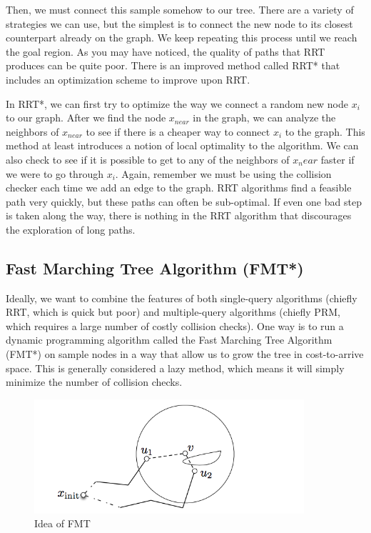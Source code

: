 \documentclass[twoside]{article}
\begin{document}
Then, we must connect this sample somehow to our tree. There are a variety of strategies we can use, but the simplest is to connect the new node to its closest counterpart already on the graph. We keep repeating this process until we reach the goal region. As you may have noticed, the quality of paths that RRT produces can be quite poor. There is an improved method called RRT* that includes an optimization scheme to improve upon RRT.

In RRT*, we can first try to optimize the way we connect a random new node $x_i$ to our graph. After we find the node $x_{near}$ in the graph, we can analyze the neighbors of $x_{near}$ to see if there is a cheaper way to connect $x_i$ to the graph. This method at least introduces a notion of local optimality to the algorithm. We can also check to see if it is possible to get to any of the neighbors of $x_near$ faster if we were to go through $x_i$. Again, remember we must be using the collision checker each time we add an edge to the graph. RRT algorithms find a feasible path very quickly, but these paths can often be sub-optimal. If even one bad step is taken along the way, there is nothing in the RRT algorithm that discourages the exploration of long paths.

\subsection{Fast Marching Tree Algorithm (FMT*)}
Ideally, we want to combine the features of both single-query algorithms (chiefly RRT, which is quick but poor) and multiple-query algorithms (chiefly PRM, which requires a large number of costly collision checks). One way is to run a dynamic programming algorithm called the Fast Marching Tree Algorithm (FMT*) on sample nodes in a way that allow us to grow the tree in cost-to-arrive space. This is generally considered a lazy method, which means it will simply minimize the number of collision checks.

\begin{figure}[h!]
  \centering
  \includegraphics[width=100mm]{fmt.png}
  \caption{Idea of FMT}
  \label{fig:plot_Idea}
\end{figure}
\end{document}
